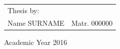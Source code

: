 \begin{titlepage}
\begin{flushright}
\begin{tabular}{ll}
Thesis by: & \tabularnewline
Name SURNAME & Matr. 000000\tabularnewline
\end{tabular}\vspace{4cm}
\par
\end{flushright}

\begin{center}
{\large{}Academic Year 2016}
\par
\end{center}{\large \par}

\end{titlepage}